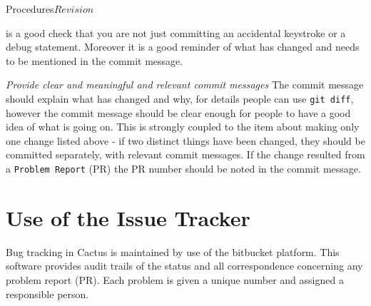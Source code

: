 \begin{cactuspart}{2}{Procedures}{}{$Revision$}
\begin{Lentry}
is a good check that you are not just
committing an accidental keystroke or a debug statement.  Moreover it
is a good reminder of what has changed and needs to be mentioned in
the commit message.
\item[{\em Provide clear and meaningful and relevant commit messages}]
The commit message should explain what has changed and why, for
details people can use {\tt \verb.git diff.}, however the commit
message should be clear enough for people to have a good idea of what
is going on.  This is strongly coupled to the item about making only
one change listed above - if two distinct things have been changed,
they should be committed separately, with relevant commit messages.
If the change resulted from a {\tt Problem Report} (PR) the PR number
should be noted in the commit message.
\end{Lentry}


\chapter{Use of the Issue Tracker}

Bug tracking in Cactus is maintained by use of the bitbucket platform.
This software provides audit trails of the status and all
correspondence concerning any problem report (PR).  Each problem is
given a unique number and assigned a responsible person.


\end{cactuspart}
